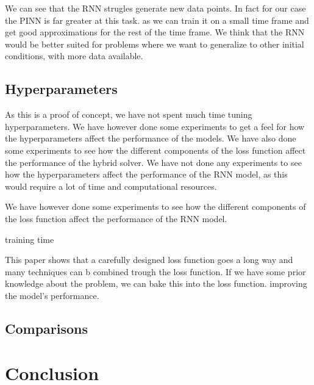 \documentclass[twoside,11pt]{report}
\begin{document}
    We can see that the RNN strugles generate new data points. In fact for our case the PINN is far greater at this task.
    as we can train it on a small time frame and get good approximations for the rest of the time frame. We think 
    that the RNN would be better suited for problems where we want to generalize to other initial conditions,
    with more data available.


\subsection{Hyperparameters}
\label{sec:hyperparameters}

    As this is a proof of concept, we have not spent much time tuning hyperparameters. We have however
    done some experiments to get a feel for how the hyperparameters affect the performance of the models.
    We have also done some experiments to see how the different components of the loss function affect
    the performance of the hybrid solver. We have not done any experiments to see how the hyperparameters
    affect the performance of the RNN model, as this would require a lot of time and computational resources.

    We have however done some experiments to see how the different components of the loss function affect
    the performance of the RNN model.

    training time

    This paper shows that a carefully designed loss function goes a long way and many techniques can b combined trough
    the loss function. If we have some prior knowledge about the problem, we can bake this into the loss function.
    improving the model's performance.

\newpage
\subsection{Comparisons}
\label{sec:comparisons}




    
\section{Conclusion}
\label{sec:conclusion}
\end{document}
